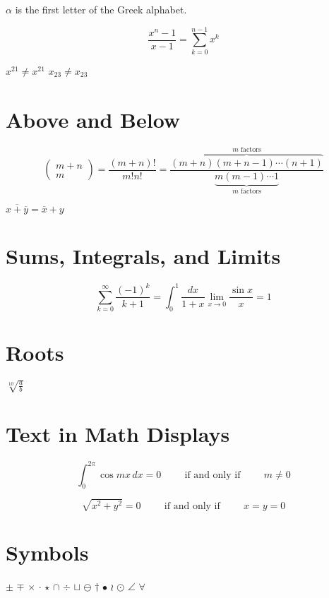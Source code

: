 \documentclass{article}
\begin{document}
$\alpha$ is the first letter of the Greek alphabet.

$$
\frac{x^n-1}{x-1} = \sum_{k=0}^{n-1}x^k
$$

$x^21 \ne x^{21}$
$x_23 \ne x_{23}$

\section{Above and Below}
$$
\left(
\begin{array}{c}
m+n\\
m
\end{array}
\right)
= \frac{(m+n)!}{m!n!}
= \frac
{\overbrace{(m+n)(m+n-1)\cdots(n+1)}^\mbox{$m$ factors}}
{\underbrace{m(m-1)\cdots 1}_\mbox{$m$ factors}}
$$

$\overline{x+\overline{y}} = \overline{x}+y$

\section{Sums, Integrals, and Limits}
$$
\sum_{k=0}^\infty\frac{(-1)^k}{k+1} = \int_0^1\frac{dx}{1+x}
\lim_{x\rightarrow 0} \frac{\sin x}{x} = 1
$$

\section{Roots}
$\sqrt[10]{\frac{a}{b}}$

\section{Text in Math Displays}
$$
\int_0^{2\pi}\cos{mx}\,dx = 0 \hspace{1cm}
\mbox{if and only if} \hspace{1cm} m\ne 0
$$

$$
\sqrt{x^2+y^2} = 0 \hspace{1cm} \mbox{if and only if} \hspace{1cm} x=y=0
$$

\section{Symbols}
$\pm$ $\mp$ $\times$ $\cdot$ $\star$ $\cap$ $\div$ $\sqcup$ $\ominus$
$\dagger$ $\bullet$ $\wr$ $\odot$ $\angle$ $\forall$
\end{document}
